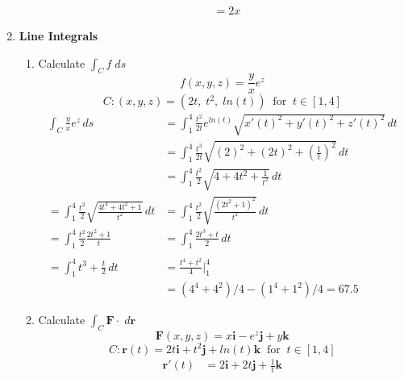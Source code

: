 \documentclass[11pt]{article}
\begin{document}
\begin{preview}
\begin{enumerate}
\begin{enumerate}
\begin{align*}
                                      & = 2x
                  \end{align*}
          \end{enumerate}
    \item \textbf{Line Integrals}
          \begin{enumerate}
            \item Calculate $\int_C f \; ds$
                  $$ f(x,y,z) = \frac{y}{x}e^z $$
                  $$C: (x,y,z) = (2t, \; t^2, \; ln(t)) \;\;\mathrm{for} \;\; t \in [1,4]$$
                  \begin{align*}
                    \int_C \frac{y}{x}e^z \,ds                                           & = \int_{1}^{4} \frac{t^2}{2t}e^{ln(t)} \sqrt{x'(t)^{2} + y'(t)^2 + z'(t)^2} \,dt        \\
                                                                                         & = \int_{1}^{4} \frac{t^3}{2t} \sqrt{(2)^{2} + (2t)^2 + \left(\frac{1}{t}\right)^2} \,dt \\
                                                                                         & = \int_{1}^{4} \frac{t^2}{2} \sqrt{4 + 4t^2 + \frac{1}{t^2}} \,dt                       \\
                    = \int_{1}^{4} \frac{t^2}{2} \sqrt{\frac{4t^4 + 4t^2 + 1}{t^2}} \,dt & = \int_{1}^{4} \frac{t^2}{2} \sqrt{\frac{(2t^2 + 1)^{2}}{t^2}} \,dt                     \\
                    = \int_{1}^{4} \frac{t^2}{2} \frac{2t^2 + 1}{t}                      & = \int_{1}^{4} \frac{2t^3 + t}{2} \,dt                                                  \\ \\
                    = \int_{1}^{4} t^3 + \frac{t}{2} \,dt                                & = \frac{t^4 + t^2}{4} \Big|_{1}^{4}                                                     \\
                                                                                         & = (4^4 + 4^2)/4 - (1^4 + 1^2)/4=67.5
                  \end{align*}
            \item Calculate $\int_C \textbf{F} \cdot \; d \textbf{r}$
                  $$ \textbf{F}(x,y,z) = x \textbf{i} - e^{z}\textbf{j} + y \textbf{k} $$
                  $$C: \textbf{r}(t) = 2t \textbf{i} + t^2 \textbf{j} + ln(t) \textbf{k} \;\;\mathrm{for} \;\; t \in [1,4]$$
                  \begin{align*}
                    \textbf{r}'(t)                          & = 2 \textbf{i} + 2t \textbf{j} + \frac{1}{t} \textbf{k}                                                                                                        \\\\

\end{align*}
\end{enumerate}
\end{enumerate}
\end{preview}
\end{document}
